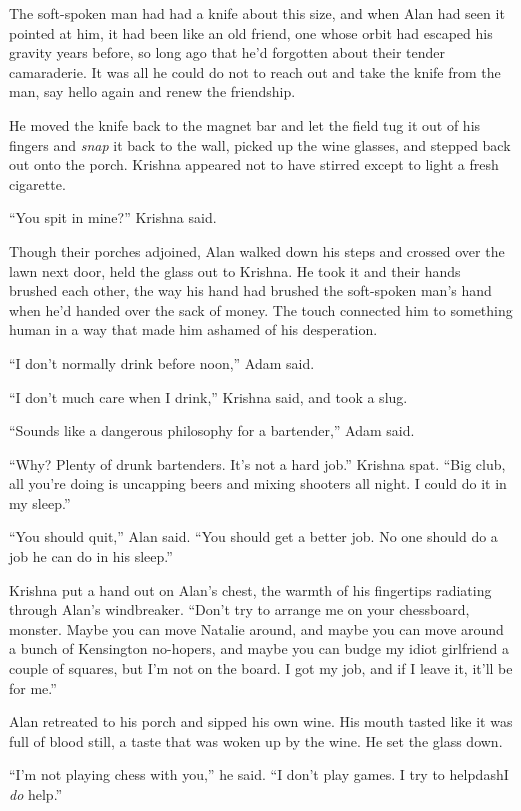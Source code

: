 The soft-spoken man had had a knife about this size, and when Alan had
seen it pointed at him, it had been like an old friend, one whose
orbit had escaped his gravity years before, so long ago that he'd
forgotten about their tender camaraderie.  It was all he could do not
to reach out and take the knife from the man, say hello again and
renew the friendship.

He moved the knife back to the magnet bar and let the field tug it out
of his fingers and \textit{snap} it back to the wall, picked up the
wine glasses, and stepped back out onto the porch.  Krishna appeared
not to have stirred except to light a fresh cigarette.

``You spit in mine?'' Krishna said.

Though their porches adjoined, Alan walked down his steps and crossed
over the lawn next door, held the glass out to Krishna.  He took it
and their hands brushed each other, the way his hand had brushed the
soft-spoken man's hand when he'd handed over the sack of money.  The
touch connected him to something human in a way that made him ashamed
of his desperation.

``I don't normally drink before noon,'' Adam said.

``I don't much care when I drink,'' Krishna said, and took a slug.

``Sounds like a dangerous philosophy for a bartender,'' Adam said.

``Why?  Plenty of drunk bartenders.  It's not a hard job.'' Krishna
spat.  ``Big club, all you're doing is uncapping beers and mixing
shooters all night.  I could do it in my sleep.''

``You should quit,'' Alan said.  ``You should get a better job.  No
one should do a job he can do in his sleep.''

Krishna put a hand out on Alan's chest, the warmth of his fingertips
radiating through Alan's windbreaker.  ``Don't try to arrange me on
your chessboard, monster.  Maybe you can move Natalie around, and
maybe you can move around a bunch of Kensington no-hopers, and maybe
you can budge my idiot girlfriend a couple of squares, but I'm not on
the board.  I got my job, and if I leave it, it'll be for me.''

Alan retreated to his porch and sipped his own wine.  His mouth tasted
like it was full of blood still, a taste that was woken up by the
wine.  He set the glass down.

``I'm not playing chess with you,'' he said.  ``I don't play games.  I
try to helpdash{}I \textit{do} help.''

